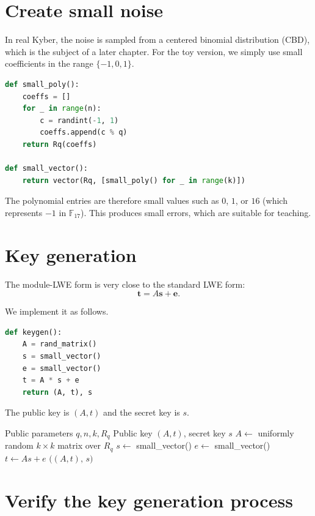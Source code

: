 \section{Create small noise}

In real Kyber, the noise is sampled from a centered binomial distribution (CBD), which is the subject of a later chapter. For the toy version, we simply use small coefficients in the range $\{-1,0,1\}$.

\begin{lstlisting}[language=Python]
def small_poly():
    coeffs = []
    for _ in range(n):
        c = randint(-1, 1)
        coeffs.append(c % q)
    return Rq(coeffs)

def small_vector():
    return vector(Rq, [small_poly() for _ in range(k)])
\end{lstlisting}

The polynomial entries are therefore small values such as $0$, $1$, or $16$ (which represents $-1$ in $\mathbb{F}_{17}$). This produces small errors, which are suitable for teaching.

\section{Key generation}

The module-LWE form is very close to the standard LWE form:
\[
\mathbf{t}=A\mathbf{s}+\mathbf{e}.
\]

We implement it as follows.

\begin{lstlisting}[language=Python]
def keygen():
    A = rand_matrix()
    s = small_vector()
    e = small_vector()
    t = A * s + e
    return (A, t), s
\end{lstlisting}

The public key is $(A,t)$ and the secret key is $s$.

\begin{algorithm}[H]
\caption{Toy KeyGen}
\label{alg:toy-keygen}
\begin{algorithmic}[1]
\Require Public parameters $q,n,k,R_q$
\Ensure Public key $(A,t)$, secret key $s$
\State $A \gets$ uniformly random $k\times k$ matrix over $R_q$
\State $s \gets$ small\_vector() 
\State $e \gets$ small\_vector()
\State $t \gets A s + e$
\State \Return $\big((A,t),\, s\big)$
\end{algorithmic}
\end{algorithm}

\section{Verify the key generation process}


